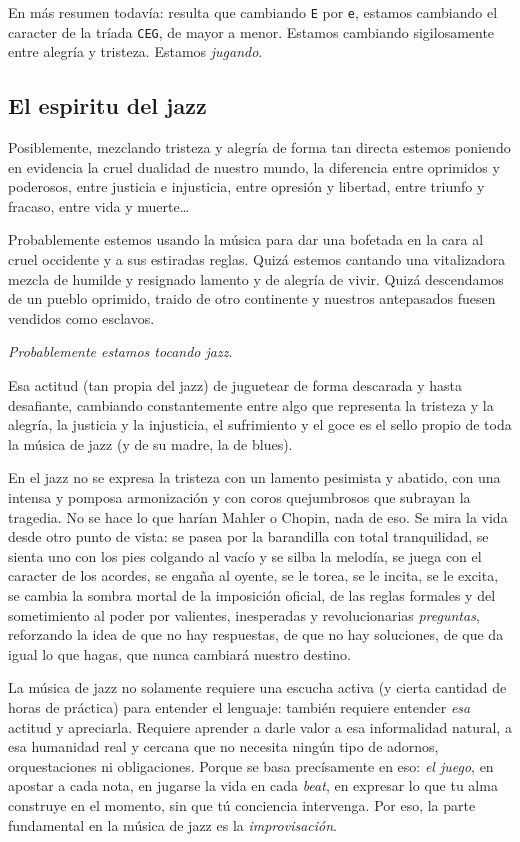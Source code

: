 \documentclass[]{article}
\begin{document}
En más resumen todavía: resulta que cambiando \texttt{E} por \texttt{e}, estamos cambiando el caracter de la tríada \texttt{CEG}, de mayor a menor. Estamos cambiando sigilosamente entre alegría y tristeza. Estamos \emph{jugando}.

\subsection{El espiritu del jazz}

Posiblemente, mezclando tristeza y alegría de forma tan directa estemos poniendo en evidencia la cruel dualidad de nuestro mundo, la diferencia entre oprimidos y poderosos, entre justicia e injusticia, entre opresión y libertad, entre triunfo y fracaso, entre vida y muerte\ldots{}

Probablemente estemos usando la música para dar una bofetada en la cara al cruel occidente y a sus estiradas reglas. Quizá estemos cantando una vitalizadora mezcla de humilde y resignado lamento y de alegría de vivir. Quizá descendamos de un pueblo oprimido, traido de otro continente y nuestros antepasados fuesen vendidos como esclavos.

\emph{Probablemente estamos tocando jazz}.

Esa actitud (tan propia del jazz) de juguetear de forma descarada y hasta desafiante, cambiando constantemente entre algo que representa la tristeza y la alegría, la justicia y la injusticia, el sufrimiento y el goce es el sello propio de toda la música de jazz (y de su madre, la de blues).

En el jazz no se expresa la tristeza con un lamento pesimista y abatido, con una intensa y pomposa armonización y con coros quejumbrosos que subrayan la tragedia. No se hace lo que harían Mahler o Chopin, nada de eso. Se mira la vida desde otro punto de vista: se pasea por la barandilla con total tranquilidad, se sienta uno con los pies colgando al vacío y se silba la melodía, se juega con el caracter de los acordes, se engaña al oyente, se le torea, se le incita, se le excita, se cambia la sombra mortal de la imposición oficial, de las reglas formales y del sometimiento al poder por valientes, inesperadas y revolucionarias \emph{preguntas}, reforzando la idea de que no hay respuestas, de que no hay soluciones, de que da igual lo que hagas, que nunca cambiará nuestro destino.

La música de jazz no solamente requiere una escucha activa (y cierta cantidad de horas de práctica) para entender el lenguaje: también requiere entender \emph{esa} actitud y apreciarla. Requiere aprender a darle valor a esa informalidad natural, a esa humanidad real y cercana que no necesita ningún tipo de adornos, orquestaciones ni obligaciones. Porque se basa precísamente en eso: \emph{el juego}, en apostar a cada nota, en jugarse la vida en cada \emph{beat}, en expresar lo que tu alma construye en el momento, sin que tú conciencia intervenga. Por eso, la parte fundamental en la música de jazz es la \emph{improvisación}.
\end{document}
